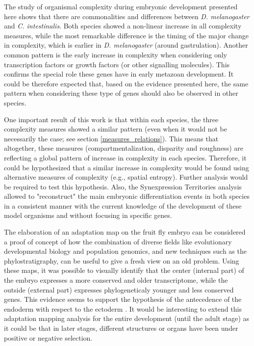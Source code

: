 
The study of organismal complexity during embryonic development presented here shows that there are commonalities and differences between \textit{D. melanogaster} and \textit{C. intestinalis}. Both species showed a non-linear increase in all complexity measures, while the most remarkable difference is the timing of the major change in complexity, which is earlier in \textit{D. melanogaster} (around gastrulation).
Another common pattern is the early increase in complexity when considering only transcription factors or growth factors (or other signalling molecules). This confirms the special role these genes have in early metazoan development. It could be therefore expected that, based on the evidence presented here, the same pattern when considering these type of genes should also be observed in other species. 

One important result of this work is that within each species, the three complexity measures showed a similar pattern (even when it would not be necessarily the case; see section \ref{measures_relations}). This means that altogether, these measures (compartmentalization, disparity and roughness) are reflecting a global pattern of increase in complexity in each species. Therefore, it could be hypothesized that a similar increase in complexity would be found using alternative measures of complexity (e.g., spatial entropy). Further analysis would be required to test this hypothesis.
Also, the Synexpression Territories analysis allowed to "reconstruct" the main embryonic differentiation events in both species in a consistent manner with the current knowledge of the development of these model organisms and without focusing in specific genes.

The elaboration of an adaptation map on the fruit fly embryo can be considered a proof of concept of how the combination of diverse fields like evolutionary developmental biology and population genomics, and new techniques such as the phylostratigraphy, can be useful to give a fresh view on an old problem.
Using these maps, it was possible to visually identify that the center (internal part) of the embryo expresses a more conserved and older transcriptome, while the outside (external part) expresses phylogeneticaly younger and less conserved genes. This evidence seems to support the hypothesis of the antecedence of the endoderm with respect to the ectoderm \citep{Hashimshony2014}. It would be interesting to extend this adaptation mapping analysis for the entire development (until the adult stage) as it could be that in later stages, different structures or organs have been under positive or negative selection.

